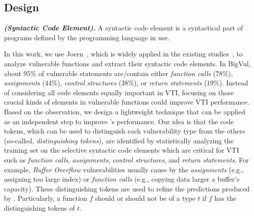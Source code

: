 \subsection{Design}
%
%
%
%
%  
%
%
%
%


\begin{definition}{\textit{\textbf{(Syntactic Code Element).}}}
A syntactic code element is a syntactical part of programs defined by the programming language in use. 
\end{definition}

In this work, we use Joern~\cite{joern}, which is widely applied in the existing studies~\cite{vuldeeppeaker,sysevr,ivdetect,linevd,velvet}, to analyze vulnerable functions and extract their syntactic code elements.
%
%
In BigVul, about 95\% of vulnerable statements are/contain either \textit{function calls} (78\%), \textit{assignments} (44\%), \textit{control structures} (38\%), or \textit{return statements} (19\%). Instead of considering all code elements equally important in VTI, focusing on those crucial kinds of elements in vulnerable functions could improve VTI performance.
%
%
%
Based on the observation, we design a lightweight technique that can be applied as an independent step to improve \base's performance. 
%
Our idea is that the code tokens, which can be used to distinguish each vulnerability type from the others (so-called, \textit{distinguishing tokens}), are identified by statistically analyzing the training set on the selective syntactic code elements which are critical for VTI such as \textit{function calls}, \textit{assignments}, \textit{control structures}, and \textit{return statements}. 
%
For example, \textit{Buffer Overflow} vulnerabilities usually cause by the \textit{assignments} (e.g., assigning too large index) or \textit{function calls} (e.g., copying data larger a buffer's capacity).
%
%
%
%
These distinguishing tokens are used to refine the predictions produced by \base. Particularly, a function $f$ should or should not be of a type $t$ if $f$ has the distinguishing tokens of $t$.


